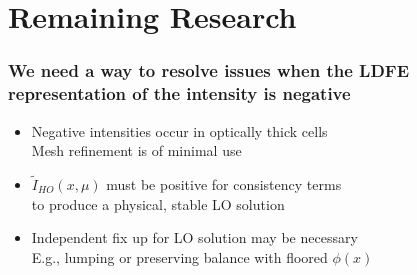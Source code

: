 \documentclass[xcolor=dvipsnames,hyperref={pdfpagelabels=false},unknownkeysallowed]{beamer}
\newcommand{\colG}[1]{{\color{Gray!110} #1}}
\newlength{\wideitemsep}
\let\olditem\item
\renewcommand{\item}{\setlength{\itemsep}{\wideitemsep}\olditem}
\begin{document}
\section{Remaining Research}

\begin{frame}
    \frametitle{We need a way to resolve issues when the LDFE representation of the intensity is
        negative}
    {\addtolength\wideitemsep{5pt}
    \begin{itemize}
        \item[] Negative intensities occur in optically thick cells \\
            \colG{Mesh refinement is of minimal use}
        \item[] $\tilde I_{HO}(x,\mu)$ must be positive for consistency terms \\
            \colG{to produce a physical, stable LO solution}
         \item[] Independent fix up for LO solution may be necessary
             \colG{\\E.g., lumping or preserving balance with floored $\phi(x)$}
    \end{itemize}
}

\end{frame}
\end{document}

